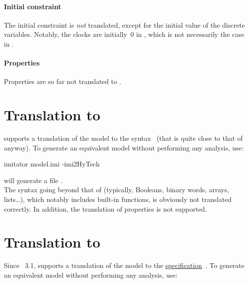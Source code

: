 \paragraph{Initial constraint}
The initial constraint is \emph{not} translated, except for the initial value of the discrete variables.
Notably, the clocks are initially~0 in \uppaal{}, which is not necessarily the case in \imitator{}.

\paragraph{Properties}
Properties are so far not translated to \uppaal{}.



\section{Translation to \hytech{}}\label{section:hytech}

\imitator{} supports a translation of the model to the \hytech{} syntax~\cite{HHW95} (that is quite close to that of \imitator{} anyway).
To generate an equivalent \hytech{} model without performing any analysis, use:

\begin{terminal}
imitator model.imi -imi2HyTech
\end{terminal}

\imitator{} will generate a file . \\

The syntax going beyond that of \hytech{} (typically, Booleans, binary words, arrays, lists…), which notably includes \imitator{} built-in functions, is obviously not translated correctly.
In addition, the translation of properties is not supported.


\section{Translation to \jani{}}\label{section:jani}

Since \imitator{}~3.1, \imitator{} supports a translation of the model to the \href{https://jani-spec.org/}{\jani{} specification}~\cite{BDHHJT17}.
To generate an equivalent \jani{} model without performing any analysis, use:

